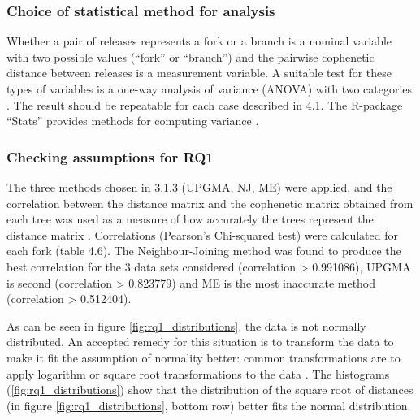 \subsubsection{Choice of statistical method for analysis}
Whether a pair of releases represents a fork or a branch is a nominal variable with two possible values (“fork” or “branch”) and the pairwise cophenetic distance between releases is a measurement variable. A suitable test for these types of variables is a one-way analysis of variance (ANOVA) with two categories \citep{McDonald2014b}. The result should be repeatable for each case described in 4.1. The R-package “Stats” provides methods for computing variance \citep[p.1211]{RDevelopmentCoreTeam2008a}.

\subsubsection{Checking assumptions for RQ1}


\noindent
The three methods chosen in 3.1.3 (UPGMA, NJ, ME) were applied, and the correlation between the distance matrix and the cophenetic matrix obtained from each tree was used as a measure of how accurately the trees represent the distance matrix \citep{Rohlf2013a}. Correlations (Pearson's Chi-squared test) were calculated for each fork (table 4.6). The Neighbour-Joining method was found to produce the best correlation for the 3 data sets considered (correlation > 0.991086), UPGMA is second (correlation > 0.823779) and ME is the most inaccurate method (correlation > 0.512404).


\noindent
As can be seen in figure \ref{fig:rq1_distributions}, the data is not normally distributed. An accepted remedy for this situation is to transform the data to make it fit the assumption of normality better: common transformations are to apply logarithm or square root transformations to the data \citep[p.141]{McDonald2014b}. The histograms (\ref{fig:rq1_distributions}) show that the distribution of the square root of distances (in figure \ref{fig:rq1_distributions}, bottom row) better fits the normal distribution.

